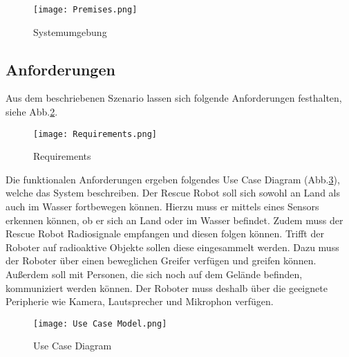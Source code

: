 \begin{figure}[H]
  \centering\texttt{[image: Premises.png]}
  \caption{Systemumgebung}
  \label{Systemumgebung}
\end{figure}

\subsection{Anforderungen}  \label{sec:reqs}
Aus dem beschriebenen Szenario lassen sich folgende Anforderungen festhalten, siehe Abb.\ref{Requirements}.

\begin{figure}[H]
  \centering\texttt{[image: Requirements.png]}
  \caption{Requirements}
  \label{Requirements}
\end{figure}

Die funktionalen Anforderungen ergeben folgendes Use Case Diagram (Abb.\ref{UseCase}), welche das System beschreiben. Der Rescue Robot soll sich sowohl an Land als auch im Wasser fortbewegen können. Hierzu muss er mittels eines Sensors erkennen können, ob er sich an Land oder im Wasser befindet. Zudem muss der Rescue Robot Radiosignale empfangen und diesen folgen können. Trifft der Roboter auf radioaktive Objekte sollen diese eingesammelt werden. Dazu muss der Roboter über einen beweglichen Greifer verfügen und greifen können. Außerdem soll mit Personen, die sich noch auf dem Gelände befinden, kommuniziert werden können. Der Roboter muss deshalb über die geeignete Peripherie wie Kamera, Lautsprecher und Mikrophon verfügen.

\begin{figure}[H]
  \centering\texttt{[image: Use Case Model.png]}
  \caption{Use Case Diagram}
  \label{UseCase}
\end{figure}

